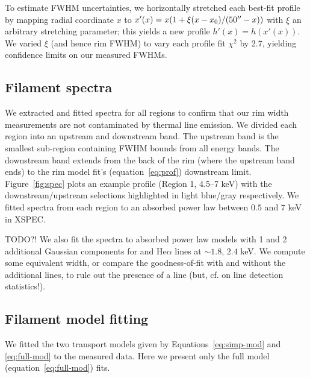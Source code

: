 \documentclass[iop, apj, numberedappendix, twocolappendix]{emulateapj}
\newcommand{\abt}{\mathord{\sim}} %
\begin{document}
To estimate FWHM uncertainties, we horizontally stretched each best-fit
profile by mapping radial coordinate $x$ to
$x'(x) = x (1 + \xi (x-x_0)/(50\mbox{$^{\prime\prime}$}-x))$ with $\xi$ an arbitrary stretching
parameter; this yields a new profile $h'(x) = h(x'(x))$.
We varied $\xi$ (and hence rim FWHM) to vary each profile fit $\chi^2$ by 2.7,
yielding confidence limits on our measured FWHMs.

\subsection{Filament spectra}

We extracted and fitted spectra for all regions to confirm that our rim width
measurements are not contaminated by thermal line emission.
We divided each region into an upstream and downstream band.  The upstream band
is the smallest sub-region containing FWHM bounds from all energy bands.
The downstream band extends from the back of the rim (where the upstream band
ends) to the rim model fit's (equation~\eqref{eq:prof}) downstream limit.
Figure~\ref{fig:spec} plots an example profile (Region 1, 4.5--7 keV) with the
downstream/upstream selections highlighted in light blue/gray respectively.
We fitted spectra from each region to an absorbed power law between $0.5$ and $7$
keV in XSPEC.

TODO?! We also fit the spectra to absorbed power law models with 1 and 2
additional Gaussian components for  and  He$\alpha$
lines at $\abt 1.8$, $2.4$ keV.  We compute some equivalent width, or compare
the goodness-of-fit with and without the additional lines, to rule out the
presence of a line (but, cf. \citet{protassov2002} on line detection
statistics!).


\subsection{Filament model fitting}

We fitted the two transport models given by Equations~\eqref{eq:simp-mod} and
\eqref{eq:full-mod} to the measured data.  Here we present only the full
model (equation~\eqref{eq:full-mod}) fits.  
\end{document}
